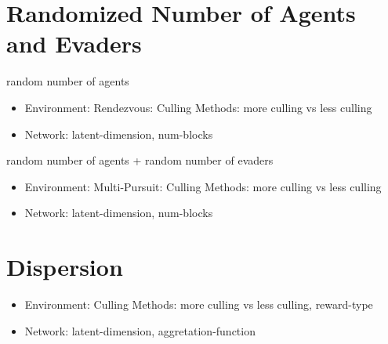 \section{Randomized Number of Agents and Evaders}
random number of agents
\begin{itemize}[noitemsep,nolistsep]
    \item Environment: Rendezvous: Culling Methods: more culling vs less culling
    \item Network: latent-dimension, num-blocks
\end{itemize}
random number of agents + random number of evaders
\begin{itemize}[noitemsep,nolistsep]
    \item Environment: Multi-Pursuit: Culling Methods: more culling vs less culling
    \item Network: latent-dimension, num-blocks
\end{itemize}

\section{Dispersion}
\begin{itemize}[noitemsep,nolistsep]
    \item Environment: Culling Methods: more culling vs less culling, reward-type
    \item Network: latent-dimension, aggretation-function
\end{itemize}